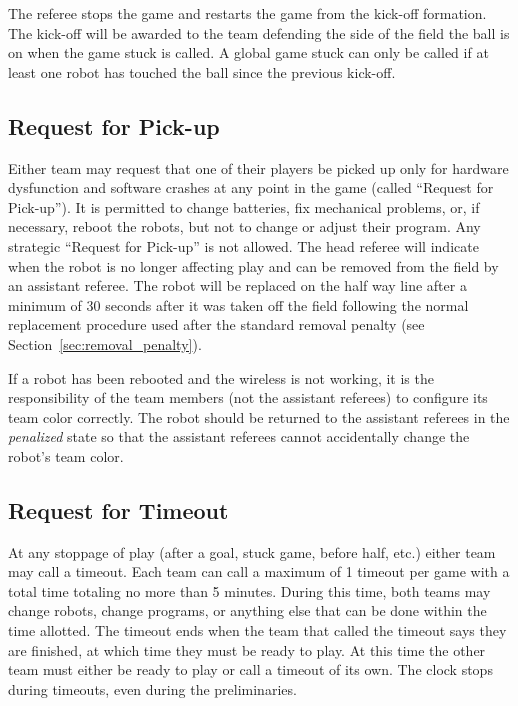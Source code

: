\documentclass[12pt]{article}
\begin{document}
The referee stops the game and restarts the game from the kick-off formation. The kick-off will be awarded to the team defending the side of the field the ball is on when the game stuck is called. A global game stuck can only be called if at least one robot has touched the ball since the previous kick-off.

\subsection{Request for Pick-up}

Either team may request that one of their players be picked up only for hardware dysfunction and software crashes at any point in the game (called ``Request for Pick-up''). It is permitted to change batteries, fix mechanical problems, or, if necessary, reboot the robots, but not to change or adjust their program. Any strategic ``Request for Pick-up'' is not allowed. The head referee will indicate when the robot is no longer affecting play and can be removed from the field by an assistant referee. The robot will be replaced on the half way line after a minimum of 30 seconds after it was taken off the field following the normal replacement procedure used after the standard removal penalty (see Section~\ref{sec:removal_penalty}).

If a robot has been rebooted and the wireless is not working, it is the responsibility of the team members (not the assistant referees) to configure its team color correctly. The robot should be returned to the assistant referees in the \emph{penalized} state so that the assistant referees cannot accidentally change the robot's team color.

\subsection{Request for Timeout}

At any stoppage of play (after a goal, stuck game, before half, etc.) either team may call a timeout. Each team can call a maximum of 1 timeout per game with a total time totaling no more than 5 minutes. During this time, both teams may change robots, change programs, or anything else that can be done within the time allotted. The timeout ends when the team that called the timeout says they are finished, at which time they must be ready to play. At this time the other team must either be ready to play or call a timeout of its own. The clock stops during timeouts, even during the preliminaries.
\end{document}
